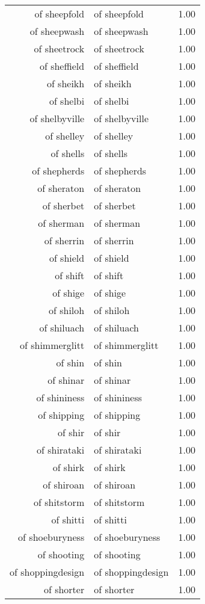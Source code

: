 \begin{table}[ht]
\begin{tabular}{rlr}
  of sheepfold & of sheepfold & 1.00 \\ 
  of sheepwash & of sheepwash & 1.00 \\ 
  of sheetrock & of sheetrock & 1.00 \\ 
  of sheffield & of sheffield & 1.00 \\ 
  of sheikh & of sheikh & 1.00 \\ 
  of shelbi & of shelbi & 1.00 \\ 
  of shelbyville & of shelbyville & 1.00 \\ 
  of shelley & of shelley & 1.00 \\ 
  of shells & of shells & 1.00 \\ 
  of shepherds & of shepherds & 1.00 \\ 
  of sheraton & of sheraton & 1.00 \\ 
  of sherbet & of sherbet & 1.00 \\ 
  of sherman & of sherman & 1.00 \\ 
  of sherrin & of sherrin & 1.00 \\ 
  of shield & of shield & 1.00 \\ 
  of shift & of shift & 1.00 \\ 
  of shige & of shige & 1.00 \\ 
  of shiloh & of shiloh & 1.00 \\ 
  of shiluach & of shiluach & 1.00 \\ 
  of shimmerglitt & of shimmerglitt & 1.00 \\ 
  of shin & of shin & 1.00 \\ 
  of shinar & of shinar & 1.00 \\ 
  of shininess & of shininess & 1.00 \\ 
  of shipping & of shipping & 1.00 \\ 
  of shir & of shir & 1.00 \\ 
  of shirataki & of shirataki & 1.00 \\ 
  of shirk & of shirk & 1.00 \\ 
  of shiroan & of shiroan & 1.00 \\ 
  of shitstorm & of shitstorm & 1.00 \\ 
  of shitti & of shitti & 1.00 \\ 
  of shoeburyness & of shoeburyness & 1.00 \\ 
  of shooting & of shooting & 1.00 \\ 
  of shoppingdesign & of shoppingdesign & 1.00 \\ 
  of shorter & of shorter & 1.00 \\ 

\end{tabular}
\end{table}
